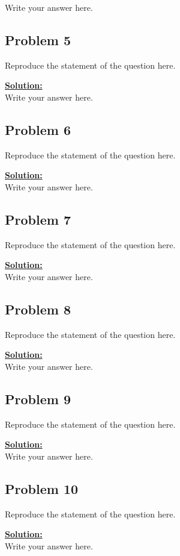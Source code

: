 \documentclass[letterpaper, 11pt, reqno]{amsart}
\begin{document}
\noindent
Write your answer here.


\subsection*{Problem 5}

Reproduce the statement of the question here.

\vspace{0.1cm}
\noindent
\underline{\textbf{Solution:}} \\

\noindent
Write your answer here.


\subsection*{Problem 6}

Reproduce the statement of the question here.

\vspace{0.1cm}
\noindent
\underline{\textbf{Solution:}} \\

\noindent
Write your answer here.


\subsection*{Problem 7}

Reproduce the statement of the question here.

\vspace{0.1cm}
\noindent
\underline{\textbf{Solution:}} \\

\noindent
Write your answer here.


\subsection*{Problem 8}

Reproduce the statement of the question here.

\vspace{0.1cm}
\noindent
\underline{\textbf{Solution:}} \\

\noindent
Write your answer here.


\subsection*{Problem 9}

Reproduce the statement of the question here.

\vspace{0.1cm}
\noindent
\underline{\textbf{Solution:}} \\

\noindent
Write your answer here.


\subsection*{Problem 10}

Reproduce the statement of the question here.

\vspace{0.1cm}
\noindent
\underline{\textbf{Solution:}} \\

\noindent
Write your answer here.
\end{document}
